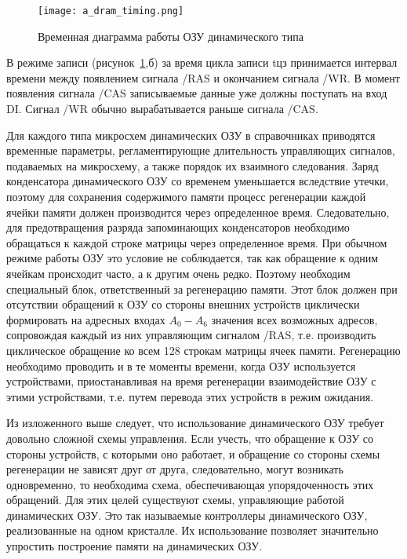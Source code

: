 \begin{figure}[ht]
\centering
  \texttt{[image: a\_dram\_timing.png]}  
  \caption{Временная диаграмма работы ОЗУ динамического типа}
  \label{fig:domain:ram:dram:dram_timing}
\end{figure}

В режиме записи (рисунок~\ref{fig:domain:ram:dram:dram_timing},б) за время цикла записи tцз принимается интервал времени между появлением сигнала /RAS и окончанием сигнала /WR. В момент появления сигнала /CAS записываемые данные уже должны поступать на вход DI. Сигнал /WR обычно вырабатывается раньше сигнала /CAS.

Для каждого типа микросхем динамических ОЗУ в справочниках приводятся временные параметры, регламентирующие длительность управляющих сигналов, подаваемых на микросхему, а также порядок их взаимного следования.
Заряд конденсатора динамического ОЗУ со временем уменьшается вследствие утечки, поэтому для сохранения содержимого памяти процесс регенерации каждой ячейки памяти должен производится через определенное время. Следовательно, для предотвращения разряда запоминающих конденсаторов необходимо обращаться к каждой строке матрицы через определенное время. При обычном режиме работы ОЗУ это условие не соблюдается, так как обращение к одним ячейкам происходит часто, а к другим очень редко. Поэтому необходим специальный блок, ответственный за регенерацию памяти. Этот блок должен при отсутствии обращений к ОЗУ со стороны внешних устройств циклически формировать на адресных входах $A_0 - A_6$ значения всех возможных адресов, сопровождая каждый из них управляющим сигналом /RAS, т.е. производить циклическое обращение ко всем 128 строкам матрицы ячеек памяти. Регенерацию необходимо проводить и в те моменты времени, когда ОЗУ используется устройствами, приостанавливая на время регенерации взаимодействие ОЗУ с этими устройствами, т.е. путем перевода этих устройств в режим ожидания.

Из изложенного выше следует, что использование динамического ОЗУ требует довольно сложной схемы управления. Если учесть, что обращение к ОЗУ со стороны устройств, с которыми оно работает, и обращение со стороны схемы регенерации не зависят друг от друга, следовательно, могут возникать одновременно, то необходима схема, обеспечивающая упорядоченность этих обращений. Для этих целей существуют схемы, управляющие работой динамических ОЗУ. Это так называемые контроллеры динамического ОЗУ, реализованные на одном кристалле. Их использование позволяет значительно упростить построение памяти на динамических ОЗУ.

